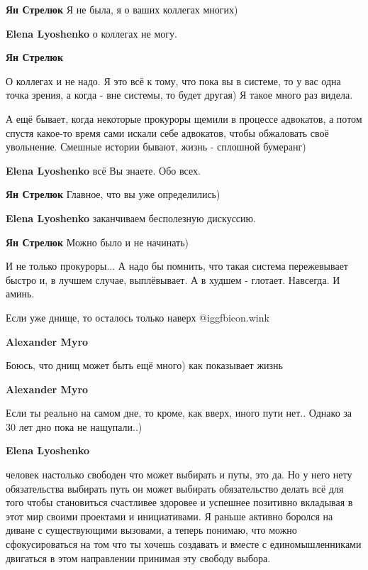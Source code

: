 \begin{itemize}
\begin{itemize}
\textbf{Ян Стрелюк}
Я не была, я о ваших коллегах многих)

\textbf{Elena Lyoshenko} о коллегах не могу.

\textbf{Ян Стрелюк}

О коллегах и не надо. Я это всё к тому, что пока вы в системе, то у вас одна
точка зрения, а когда - вне системы, то будет другая) Я такое много раз видела.

А ещё бывает, когда некоторые прокуроры щемили в процессе адвокатов, а потом
спустя какое-то время сами искали себе адвокатов, чтобы обжаловать своё
увольнение. Смешные истории бывают, жизнь - сплошной бумеранг)

\textbf{Elena Lyoshenko} всё Вы знаете. Обо всех.

\textbf{Ян Стрелюк}
Главное, что вы уже определились)

\textbf{Elena Lyoshenko} заканчиваем бесполезную дискуссию.

\textbf{Ян Стрелюк}
Можно было и не начинать)

И не только прокуроры...
А надо бы помнить, что такая система пережевывает быстро и, в лучшем случае, выплёвывает. А в худшем - глотает. Навсегда. И аминь.

\end{itemize} %


Если уже днище, то осталось только наверх  @igg{fbicon.wink} 

\begin{itemize} %
\textbf{Alexander Myro}

Боюсь, что днищ может быть ещё много) как показывает жизнь

\textbf{Alexander Myro}

Если ты реально на самом дне, то кроме, как вверх, иного пути нет..
Однако за 30 лет дно пока не нащупали..)

\textbf{Elena Lyoshenko} 

человек настолько свободен что может выбирать и путы, это да. Но у него нету
обязательства выбирать путь он может выбирать обязательство делать всё для того
чтобы становиться счастливее здоровее и успешнее позитивно вкладывая в этот мир
своими проектами и инициативами. Я раньше активно боролся на диване с
существующими вызовами, а теперь понимаю, что можно сфокусироваться на том что
ты хочешь создавать и вместе с единомышленниками двигаться в этом направлении
принимая эту свободу выбора.



\end{itemize}
\end{itemize}
